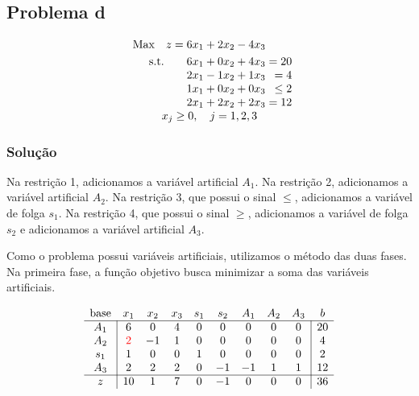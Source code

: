 \documentclass{article}
\begin{document}
\subsection{Problema d}

\[
  \begin{array}{r@{}r@{}r@{}r@{}r@{}r}
    \text{Max} \quad z =  6x_1 &{} + 2x_2 &{} -  4x_3 &{} \\[\jot]
    \text{s.t.}\quad\quad 6x_1 &{} + 0x_2 &{} +  4x_3 &{} = 20 \\
                          2x_1 &{} - 1x_2 &{} +  1x_3 &{} = 4 \\
                          1x_1 &{} + 0x_2 &{} +  0x_3 &{} \leq 2 \\
                          2x_1 &{} + 2x_2 &{} +  2x_3 &{} = 12 \\

    \multicolumn{4}{c}{x_j \geq 0, \quad j=1, 2, 3}
  \end{array}
\]

\subsubsection{Solução}

Na restrição 1, adicionamos a variável artificial $A_1$.
Na restrição 2, adicionamos a variável artificial $A_2$.
Na restrição 3, que possui o sinal $\leq$, adicionamos a variável de folga $s_1$.
Na restrição 4, que possui o sinal $\geq$, adicionamos a variável de folga $s_2$ e adicionamos a variável artificial $A_3$.

Como o problema possui variáveis artificiais, utilizamos o método das duas fases. Na primeira fase, a função objetivo busca minimizar a soma das variáveis artificiais.


\[
  \begin{array}{c|cccccccc|c}
    \text{base} &                         x_1 & x_2 & x_3 & s_1 & s_2 & A_1 & A_2 & A_3 &  b \\ \hline
            A_1 &                           6 &   0 &   4 &   0 &   0 &   0 &   0 &   0 & 20 \\
            A_2 & \color{red} 2 \color{black} &  -1 &   1 &   0 &   0 &   0 &   0 &   0 &  4 \\
            s_1 &                           1 &   0 &   0 &   1 &   0 &   0 &   0 &   0 &  2 \\
            A_3 &                           2 &   2 &   2 &   0 &  -1 &  -1 &   1 &   1 & 12 \\ \hline
              z &                          10 &   1 &   7 &   0 &  -1 &   0 &   0 &   0 & 36
  \end{array}
\]
\end{document}
